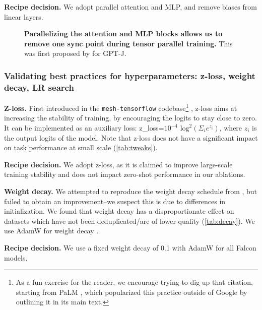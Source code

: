 \documentclass{article}
\DeclareRobustCommand{\hardware}[1]{\textcolor{Mahogany}{#1}}
\begin{document}
\begin{mdframed}
\textbf{Recipe decision.} We adopt parallel attention and MLP, and remove biases from linear layers.
\end{mdframed}

\begin{figure}[t]
    \centering
    
    \caption{\hardware{\textbf{Parallelizing the attention and MLP blocks allows us to remove one sync point during tensor parallel training.}} This was first proposed by \citet{gpt-j} for GPT-J.}
    \label{fig:parllel_attn}
    \vspace{-0.2in}
\end{figure}

\subsubsection{Validating best practices for hyperparameters: z-loss, weight decay, LR search}
\label{sec:hyperparam_abl}

\textbf{Z-loss.} First introduced in the \texttt{mesh-tensorflow} codebase\footnote{As a fun exercise for the reader, we encourage trying to dig up that citation, starting from PaLM \citep{palm}, which popularized this practice outside of Google by outlining it in its main text.} \citet{meshtf}, z-loss aims at increasing the stability of training, by encouraging the logits to stay close to zero. It can be implemented as an auxiliary loss: z\_loss=$10^{-4} \text{ log}^2(\Sigma_i e^{z_i})$, where $z_i$ is the output logits of the model. Note that z-loss does not have a significant impact on task performance at small scale (\cref{tab:tweaks}).

\begin{mdframed}
\textbf{Recipe decision.} We adopt z-loss, as it is claimed to improve large-scale training stability and does not impact zero-shot performance in our ablations.
\end{mdframed}

\newpage
\textbf{Weight decay.} We attempted to reproduce the weight decay schedule from \citet{palm}, but failed to obtain an improvement--we suspect this is due to differences in initialization. We found that weight decay has a disproportionate effect on datasets which have not been deduplicated/are of lower quality (\cref{tab:decay}). We use AdamW for weight decay \citep{loshchilov2018decoupled}.

\begin{mdframed}
\textbf{Recipe decision.} We use a fixed weight decay of 0.1 with AdamW for all Falcon models.
\end{mdframed}
\end{document}
